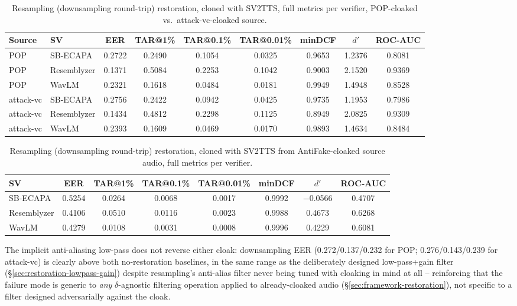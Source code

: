 \documentclass[11pt]{article}
\begin{document}
\begin{table}[H]
\centering
\caption{Resampling (downsampling round-trip) restoration, cloned with
SV2TTS, full metrics per verifier, POP-cloaked vs.\ attack-vc-cloaked
source.}
\label{tab:restoration-resampling-results}
\begin{tabular}{llccccccc}
\toprule
Source & SV & EER & TAR@1\% & TAR@0.1\% & TAR@0.01\% & minDCF & $d'$ & ROC-AUC \\
\midrule
POP        & SB-ECAPA    & 0.2722 & 0.2490 & 0.1054 & 0.0325 & 0.9653 & 1.2376 & 0.8081 \\
POP        & Resemblyzer & 0.1371 & 0.5084 & 0.2253 & 0.1042 & 0.9003 & 2.1520 & 0.9369 \\
POP        & WavLM       & 0.2321 & 0.1618 & 0.0484 & 0.0181 & 0.9949 & 1.4948 & 0.8528 \\
\addlinespace
attack-vc  & SB-ECAPA    & 0.2756 & 0.2422 & 0.0942 & 0.0425 & 0.9735 & 1.1953 & 0.7986 \\
attack-vc  & Resemblyzer & 0.1434 & 0.4812 & 0.2298 & 0.1125 & 0.8949 & 2.0825 & 0.9309 \\
attack-vc  & WavLM       & 0.2393 & 0.1609 & 0.0469 & 0.0170 & 0.9893 & 1.4634 & 0.8484 \\
\bottomrule
\end{tabular}
\end{table}

\begin{table}[H]
\centering
\caption{Resampling (downsampling round-trip) restoration, cloned with
SV2TTS from AntiFake-cloaked source audio, full metrics per verifier.}
\label{tab:restoration-downsampling-antifake-results}
\begin{tabular}{lccccccc}
\toprule
SV & EER & TAR@1\% & TAR@0.1\% & TAR@0.01\% & minDCF & $d'$ & ROC-AUC \\
\midrule
SB-ECAPA    & 0.5254 & 0.0264 & 0.0068 & 0.0017 & 0.9992 & $-$0.0566 & 0.4707 \\
Resemblyzer & 0.4106 & 0.0510 & 0.0116 & 0.0023 & 0.9988 & 0.4673 & 0.6268 \\
WavLM       & 0.4279 & 0.0108 & 0.0031 & 0.0008 & 0.9996 & 0.4229 & 0.6081 \\
\bottomrule
\end{tabular}
\end{table}

The implicit anti-aliasing low-pass does not reverse either cloak:
downsampling EER (0.272/0.137/0.232 for POP; 0.276/0.143/0.239 for
attack-vc) is clearly above both no-restoration baselines, in the same
range as the deliberately designed low-pass+gain filter
(\S\ref{sec:restoration-lowpass-gain}) despite resampling's anti-alias
filter never being tuned with cloaking in mind at all -- reinforcing
that the failure mode is generic to \emph{any} $\delta$-agnostic
filtering operation applied to already-cloaked audio
(\S\ref{sec:framework-restoration}), not specific to a filter designed
adversarially against the cloak.
\end{document}
